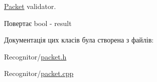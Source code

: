 \hyperlink{classPacket}{Packet} validator. 

\begin{DoxyReturn}{Повертає}
bool -\/ result 
\end{DoxyReturn}


Документація цих класів була створена з файлів\-:\begin{DoxyCompactItemize}
\item 
Recognitor/\hyperlink{packet_8h}{packet.\-h}\item 
Recognitor/\hyperlink{packet_8cpp}{packet.\-cpp}\end{DoxyCompactItemize}
